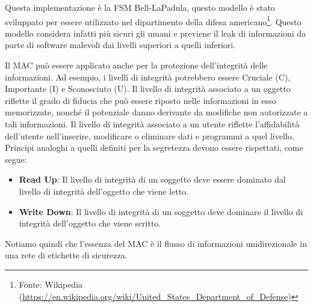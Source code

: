             Questa implementazione è la FSM Bell-LaPadula, questo modello è stato sviluppato per essere utilizzato nel dipartimento della difesa americano\footnote{Fonte: Wikipedia (\url{https://en.wikipedia.org/wiki/United_States_Department_of_Defense})}. Questo modello considera infatti più sicuri gli umani e previene il leak di informazioni da parte di software malevoli dai livelli superiori a quelli inferiori.

             Il MAC può essere applicato anche per la protezione dell'integrità delle informazioni. Ad esempio, i livelli di integrità potrebbero essere Cruciale (C), Importante (I) e Sconosciuto (U). Il livello di integrità associato a un oggetto riflette il grado di fiducia che può essere riposto nelle informazioni in esso memorizzate, nonché il potenziale danno derivante da modifiche non autorizzate a tali informazioni. Il livello di integrità associato a un utente riflette l'affidabilità dell'utente nell'inserire, modificare o eliminare dati e programmi a quel livello. Principi analoghi a quelli definiti per la segretezza devono essere rispettati, come segue:
             \begin{itemize}
                 \item \textbf{Read Up}: Il livello di integrità di un soggetto deve essere dominato dal livello di integrità dell'oggetto che viene letto.
                 \item \textbf{Write Down}: Il livello di integrità di un soggetto deve dominare il livello di integrità dell'oggetto che viene scritto.
             \end{itemize}
            Notiamo quindi che l'essenza del MAC è il flusso di informazioni unidirezionale in una rete di etichette di sicurezza.

\newpage


